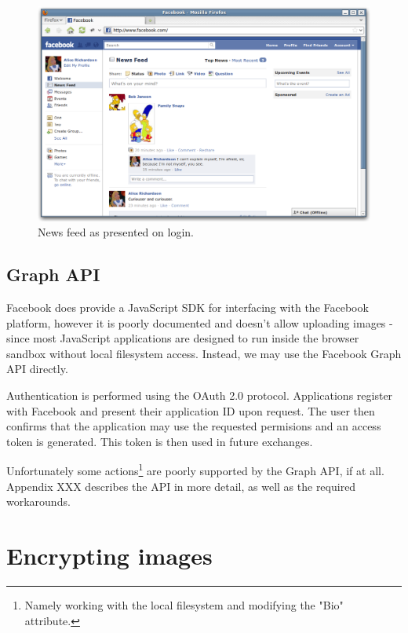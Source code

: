     \begin{figure}[tb]
        \begin{center}
                \includegraphics[width=12cm]{screens/facebook.png}
            \caption{News feed as presented on login.}
            \label{scn:fbook}
        \end{center}
    \end{figure}

\FloatBarrier
\subsection{Graph API}

Facebook does provide a JavaScript SDK for interfacing with the Facebook platform, however it is poorly documented and doesn't allow uploading images - since most JavaScript applications are designed to run inside the browser sandbox without local filesystem access. Instead, we may use the Facebook Graph API directly.

Authentication is performed using the OAuth 2.0 protocol. Applications register with Facebook and present their application ID upon request. The user then confirms that the application may use the requested permisions and an access token is generated. This token is then used in future exchanges.

Unfortunately some actions\footnote{Namely working with the local filesystem and modifying the "Bio" attribute.} are poorly supported by the Graph API, if at all. Appendix XXX describes the API in more detail, as well as the required workarounds.

    
\FloatBarrier
\section{Encrypting images}
\label{ssec:images}


